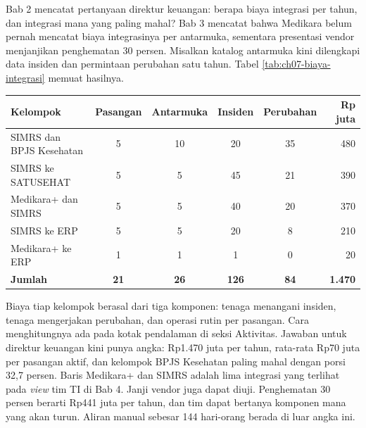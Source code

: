 \begin{kasus}[title={Kasus Medikara Health: Menjawab Pertanyaan Direktur Keuangan}]
  Bab 2 mencatat pertanyaan direktur keuangan: berapa biaya integrasi per tahun, dan integrasi mana yang paling mahal?
  Bab 3 mencatat bahwa Medikara belum pernah mencatat biaya integrasinya per antarmuka, sementara presentasi vendor
  menjanjikan penghematan 30 persen. Misalkan katalog antarmuka kini dilengkapi data insiden dan permintaan perubahan
  satu tahun. Tabel \ref{tab:ch07-biaya-integrasi} memuat hasilnya.

  \begin{center}
    \label{tab:ch07-biaya-integrasi}
    \small
    \begin{tabularx}{\linewidth}{>{\raggedright\arraybackslash}Xccccr}
      \hline
      \textbf{Kelompok} & \textbf{Pasangan} & \textbf{Antarmuka} & \textbf{Insiden} & \textbf{Perubahan} & \textbf{Rp juta} \\
      \hline
      SIMRS dan BPJS Kesehatan & 5 & 10 & 20 & 35 & 480 \\
      \hline
      SIMRS ke SATUSEHAT & 5 & 5 & 45 & 21 & 390 \\
      \hline
      Medikara+ dan SIMRS & 5 & 5 & 40 & 20 & 370 \\
      \hline
      SIMRS ke ERP & 5 & 5 & 20 & 8 & 210 \\
      \hline
      Medikara+ ke ERP & 1 & 1 & 1 & 0 & 20 \\
      \hline
      \textbf{Jumlah} & \textbf{21} & \textbf{26} & \textbf{126} & \textbf{84} & \textbf{1.470} \\
      \hline
    \end{tabularx}
  \end{center}

  Biaya tiap kelompok berasal dari tiga komponen: tenaga menangani insiden, tenaga mengerjakan perubahan, dan operasi
  rutin per pasangan. Cara menghitungnya ada pada kotak pendalaman di seksi Aktivitas. Jawaban untuk direktur keuangan
  kini punya angka: Rp1.470 juta per tahun, rata-rata Rp70 juta per pasangan aktif, dan kelompok BPJS Kesehatan paling
  mahal dengan porsi 32,7 persen. Baris Medikara+ dan SIMRS adalah lima integrasi yang terlihat pada \textit{view} tim TI di
  Bab 4. Janji vendor juga dapat diuji. Penghematan 30 persen berarti Rp441 juta per tahun, dan tim dapat bertanya komponen
  mana yang akan turun. Aliran manual sebesar 144 hari-orang berada di luar angka ini.
\end{kasus}

